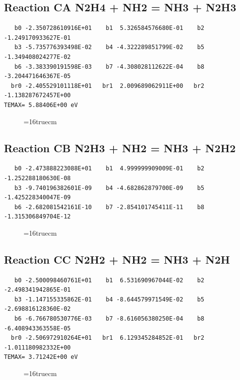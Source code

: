 \documentclass[12pt,dvipdfm]{article}
\begin{document}
\subsection{
Reaction CA N2H4 + NH2  = NH3 + N2H3}
\begin{small}\begin{verbatim}
   b0 -2.350728610916E+01    b1  5.326584576680E-01    b2 -1.249170933627E-01
   b3 -5.735776393498E-02    b4 -4.322289851799E-02    b5 -1.349408024277E-02
   b6 -3.383390191598E-03    b7 -4.308028112622E-04    b8 -3.204471646367E-05
  br0 -2.405529101118E+01   br1  2.009689062911E+00   br2 -1.138287672457E+00
TEMAX= 5.88406E+00 eV
   \end{verbatim}\end{small}
\begin{figure}[h!]
\label{n2rates}
\epsfxsize=16truecm
\end{figure}
\newpage

\subsection{
Reaction CB N2H3 + NH2  = NH3 + N2H2 }
\begin{small}\begin{verbatim}
   b0 -2.473888223088E+01    b1  4.999999909009E-01    b2 -1.252288180630E-08
   b3 -9.740196382601E-09    b4 -4.682862879700E-09    b5 -1.425228340047E-09
   b6 -2.682081542161E-10    b7 -2.854101745411E-11    b8 -1.315306849704E-12
   \end{verbatim}\end{small}
\begin{figure}[h!]
\label{n2rates}
\epsfxsize=16truecm
\end{figure}
\newpage

\subsection{
Reaction CC N2H2 + NH2  = NH3 + N2H }
\begin{small}\begin{verbatim}
   b0 -2.500098460761E+01    b1  6.531690967044E-02    b2 -2.498341942865E-01
   b3 -1.147155335862E-01    b4 -8.644579971549E-02    b5 -2.698816128360E-02
   b6 -6.766780530776E-03    b7 -8.616056380250E-04    b8 -6.408943363558E-05
  br0 -2.506972910264E+01   br1  6.129345284852E-01   br2 -1.011180982332E+00
TEMAX= 3.71242E+00 eV
   \end{verbatim}\end{small}
\begin{figure}[h!]
\label{n2rates}
\epsfxsize=16truecm
\end{figure}
\newpage
\end{document}
